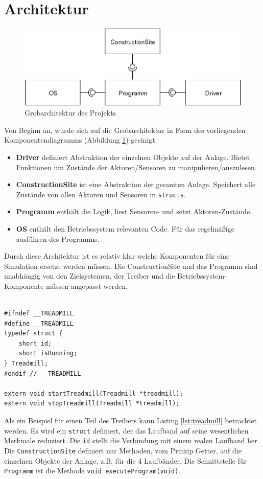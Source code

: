 \documentclass[fontsize=11pt,a4paper,final]{scrartcl}[2003/01/01]
\makeatletter
\def\ScaleIfNeeded{%
	\ifdim\Gin@nat@width>\linewidth
		\linewidth
	\else
		\Gin@nat@width
	\fi
}
\makeatother
\begin{document}
\section{Architektur}
\label{sec:arch}

\begin{figure}[H]
	\centering
	\includegraphics[width=1\ScaleIfNeeded]{Bilder/architektur.png}
	\caption{Grobarchitektur des Projekts}
	\label{fig:Architektur}
\end{figure}
Von Beginn an, wurde sich auf die Grobarchitektur in Form des vorliegenden Komponentendiagramms (Abbildung \ref{fig:Architektur}) geeinigt.

\begin{itemize}
 \item \textbf{Driver} definiert Abstraktion der einzelnen Objekte auf der Anlage. Bietet Funktionen um Zustände der Aktoren/Sensoren zu manipulieren/auszulesen.
 \item \textbf{ConstructionSite} ist eine Abstraktion der gesamten Anlage. Speichert alle Zustände von allen Aktoren und Sensoren in \lstinline|structs|.
 \item \textbf{Programm} enthält die Logik, liest Sensoren- und setzt Aktoren-Zustände.
 \item \textbf{OS} enthält den Betriebssystem relevanten Code. Für das regelmäßige ausführen des Programms.
\end{itemize}

\noindent Durch diese Architektur ist es relativ klar welche Komponenten für eine Simulation ersetzt werden müssen. Die ConstructionSite und das Programm sind unabhängig von den Zielsystemen, der Treiber und die Betriebssystem-Komponente müssen angepasst werden.\\
\\

\begin{lstlisting}[caption={Beispiel: Treiber für Laufband},label={lst:treadmill}]
#ifndef __TREADMILL
#define __TREADMILL
typedef struct {
    short id;
    short isRunning;
} Treadmill;
#endif // __TREADMILL

extern void startTreadmill(Treadmill *treadmill);
extern void stopTreadmill(Treadmill *treadmill);
\end{lstlisting}
Als ein Beispiel für einen Teil des Treibers kann Listing \ref{lst:treadmill} betrachtet werden. Es wird ein \lstinline|struct| definiert, der das Laufband auf seine wesentlichen Merkmale reduziert. Die \lstinline|id| stellt die Verbindung mit einem realen Laufband her. Die \lstinline|ConstructionSite| definiert nur Methoden, vom Prinzip  Getter, auf die einzelnen Objekte der Anlage, z.B. für die 4 Laufbänder. Die Schnittstelle für \lstinline|Programm| ist die Methode \lstinline|void executeProgram(void)|.
\end{document}
